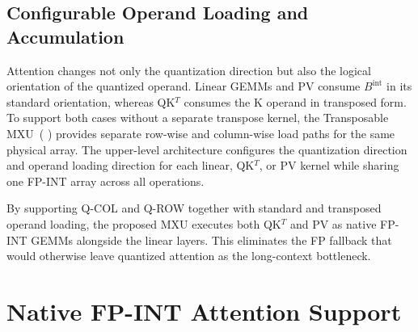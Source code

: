 \documentclass[sigconf,anonymous,nonacm]{acmart}
\newcommand{\fpint}{FP-INT}
\newcommand{\qcol}{Q-COL}
\newcommand{\qrow}{Q-ROW}
\newcommand{\blackcircletext}[1]{%
  \tikz[baseline=-0.5ex]{
    \node[
      circle,
      fill=black,
      text=white,
      inner sep=0pt,
      minimum size=7pt,
      font=\fontsize{5}{5}\selectfont\bfseries
    ] (char) {#1};
  }%
}
\begin{document}
\subsection{Configurable Operand Loading and Accumulation}

Attention changes not only the quantization direction but also the logical orientation of the quantized operand. Linear GEMMs and PV consume $B^{\mathrm{int}}$ in its standard orientation, whereas QK$^T$ consumes the K operand in transposed form. To support both cases without a separate transpose kernel, the Transposable MXU~(\blackcircletext{3}) provides separate row-wise and column-wise load paths for the same physical array. 
The upper-level architecture configures the quantization direction and operand loading direction for each linear, QK$^T$, or PV kernel while sharing one \fpint{} array across all operations.


By supporting \qcol{} and \qrow{} together with standard and transposed operand loading, the proposed MXU executes both QK$^T$ and PV as native \fpint{} GEMMs alongside the linear layers. This eliminates the FP fallback that would otherwise leave quantized attention as the long-context bottleneck.





\iffalse
\section[Native FP-INT Attention Support]{Native \texorpdfstring{\fpint{}}{FP-INT} Attention Support}
\end{document}
